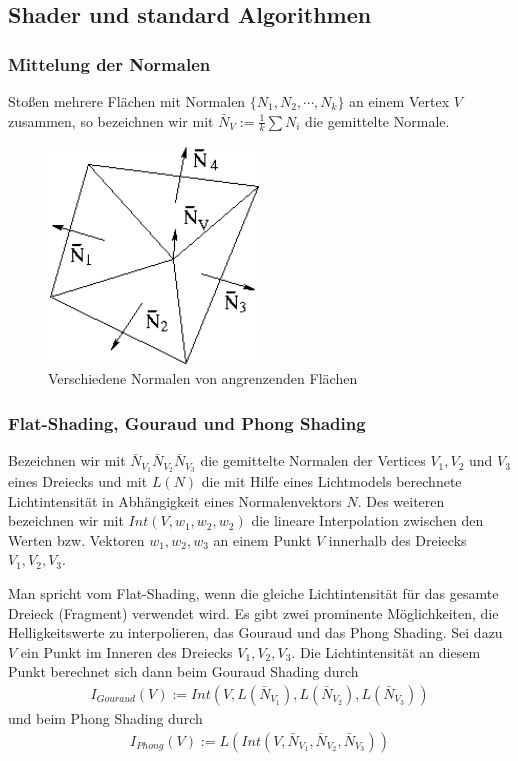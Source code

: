 \subsection{Shader und standard Algorithmen}
\subsubsection{Mittelung der Normalen}
Stoßen mehrere Flächen mit Normalen $\{ N_1, N_2, \cdots, N_k \}$ an einem Vertex $V$ zusammen, so  bezeichnen wir  mit
$\bar{N}_V:= \frac{1}{k}\sum N_i$ die gemittelte Normale.
\begin{figure}[H]
    \centering
    \includegraphics[width=0.5\textwidth]{images/gouraud_normals.png}
    \caption{Verschiedene Normalen von angrenzenden Flächen}
    \label{fig:gouraud-shading-scanline}
\end{figure}

\subsubsection{Flat-Shading, Gouraud und Phong Shading}
Bezeichnen wir mit  $\bar{N}_{V_1} \bar{N}_{V_2} \bar{N}_{V_3}$ die gemittelte Normalen der Vertices $V_1, V_2$ und $V_3$ eines Dreiecks  und mit
$L(N)$ die mit Hilfe eines Lichtmodels berechnete Lichtintensität in Abhängigkeit eines Normalenvektors $N$. Des weiteren bezeichnen wir mit 
$Int(V, w_1, w_2, w_2)$ die lineare Interpolation zwischen den Werten bzw. Vektoren $w_1, w_2, w_3$ an einem  Punkt $V$ innerhalb  des Dreiecks    $V_1, V_2, V_3$.

Man spricht vom Flat-Shading, wenn die gleiche  Lichtintensität für das gesamte Dreieck (Fragment) verwendet wird.
Es gibt zwei prominente Möglichkeiten, die Helligkeitswerte zu interpolieren, das  Gouraud und das Phong Shading. 
Sei dazu $V$ ein Punkt im Inneren des Dreiecks    $V_1, V_2, V_3$. Die Lichtintensität an diesem Punkt berechnet sich dann beim Gouraud Shading durch
\begin{align}
I_{Gouraud}(V) := Int(V,  L (\bar{N}_{V_1}), L( \bar{N}_{V_2}), L( \bar{N}_{V_3} ))
\end{align} 
 und beim Phong Shading durch 
\begin{align}
I_{Phong}(V) := L (Int(V,\bar{N}_{V_1},  \bar{N}_{V_2}, \bar{N}_{V_3} ))
\end{align}


